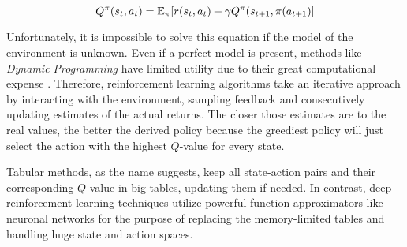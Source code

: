 \begin{equation}
    Q^\pi(s_t, a_t) = \operatorname{\mathbb{E}}_\pi[r(s_t, a_t) + \gamma Q^\pi(s_{t+1}, \pi(a_{t+1})]
\end{equation}

Unfortunately, it is impossible to solve this equation if the model of the environment is unknown. Even if a perfect model is present, methods like \textit{Dynamic Programming} have limited utility due to their great computational expense \cite[p.~73]{Sutton1998}. Therefore, reinforcement learning algorithms take an iterative approach by interacting with the environment, sampling feedback and consecutively updating estimates of the actual returns. The closer those estimates are to the real values, the better the derived policy because the greediest policy will just select the action with the highest $Q$-value for every state.
\par
Tabular methods, as the name suggests,  keep all state-action pairs and their corresponding $Q$-value in big tables, updating them if needed. In contrast, deep reinforcement learning techniques utilize powerful function approximators like neuronal networks for the purpose of replacing the memory-limited tables and handling huge state and action spaces.